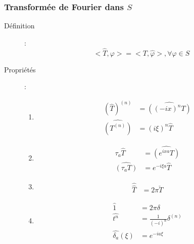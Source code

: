 \subsubsection{Transformée de Fourier dans $S$}
\begin{description}
\item[Définition] :
    \[
        <\widehat{T},\varphi>=<T,\widehat{\varphi}>,\forall\varphi\in S
    \]
\item[Propriétés] :
\begin{multicols}{2}
    \begin{enumerate}
        \item\begin{align*}
            (\widehat{T})^{(n)}&=\widehat{((-ix)^nT)}\\
            \widehat{(T^{(n)})}&=(i\xi)^n\widehat{T}
        \end{align*}
        \item\begin{align*}
            \tau_a\widehat{T}&=\widehat{(e^{ixa}T)}\\
            \widehat{(\tau_aT)}&=e^{-i\xi a}\widehat{T}
        \end{align*}
        \item\begin{align*}
            \widehat{\widehat{T}}&=2\pi\check T
        \end{align*}
        \item\begin{align*}
            \hat 1 &= 2\pi\delta\\
            \widehat{t^n}&=\frac{1}{(-i)^n}\delta^{(n)}\\
            \widehat{\delta_a}(\xi)&=e^{-ia\xi}
        \end{align*}
    \end{enumerate}
\end{multicols}
\end{description}